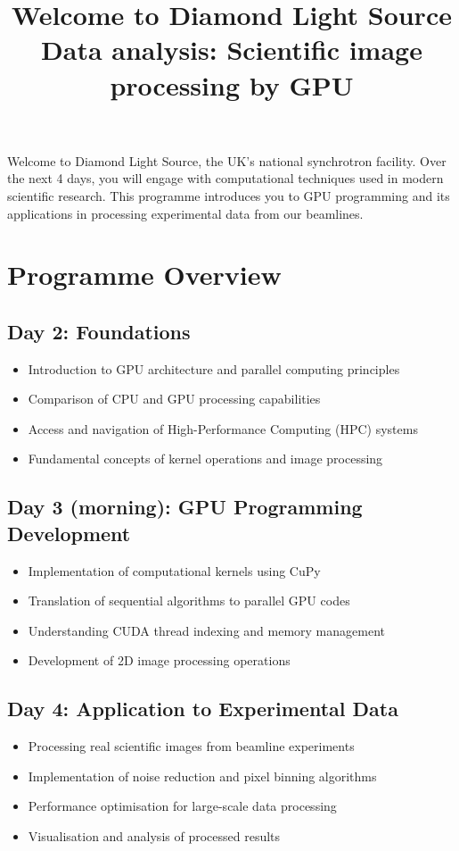 \documentclass[11pt, a4paper]{article}
\title{Welcome to Diamond Light Source\\[0.5em]
\large Data analysis: Scientific image processing by GPU}
\author{}
\date{}
\begin{document}
\maketitle

Welcome to Diamond Light Source, the UK's national synchrotron facility. Over the next 4 days, you will engage with computational techniques used in modern scientific research. This programme introduces you to GPU programming and its applications in processing experimental data from our beamlines.

\section*{Programme Overview}

\subsection*{Day 2: Foundations}
\begin{itemize}
    \item Introduction to GPU architecture and parallel computing principles
    \item Comparison of CPU and GPU processing capabilities
    \item Access and navigation of High-Performance Computing (HPC) systems
    \item Fundamental concepts of kernel operations and image processing
\end{itemize}

\subsection*{Day 3 (morning): GPU Programming Development}
\begin{itemize}
    \item Implementation of computational kernels using CuPy
    \item Translation of sequential algorithms to parallel GPU codes
    \item Understanding CUDA thread indexing and memory management
    \item Development of 2D image processing operations
\end{itemize}

\subsection*{Day 4: Application to Experimental Data}
\begin{itemize}
    \item Processing real scientific images from beamline experiments
    \item Implementation of noise reduction and pixel binning algorithms
    \item Performance optimisation for large-scale data processing
    \item Visualisation and analysis of processed results
\end{itemize}
\end{document}
